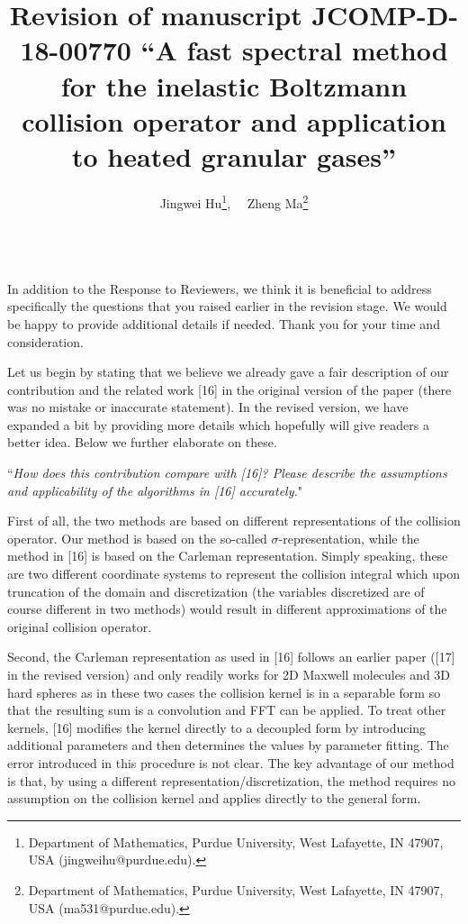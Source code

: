 \documentclass[11pt]{article}
\begin{document}
\title{Revision of manuscript JCOMP-D-18-00770  ``A fast spectral method for the inelastic Boltzmann collision operator and application to heated granular gases''}
\author{Jingwei Hu\footnote{Department of Mathematics, Purdue University, West Lafayette, IN 47907, USA (jingweihu@purdue.edu).}, \  \  
	    Zheng Ma\footnote{Department of Mathematics, Purdue University, West Lafayette, IN 47907, USA (ma531@purdue.edu).}
           }      
	\maketitle

\\

In addition to the Response to Reviewers, we think it is beneficial to address specifically the questions that you raised earlier in the revision stage. We would be happy to provide additional details if needed. Thank you for your time and consideration.

\bigskip
Let us begin by stating that we believe we already gave a fair description of our contribution and the related work [16] in the original version of the paper (there was no mistake or inaccurate statement). In the revised version, we have expanded a bit by providing more details which hopefully will give readers a better idea. Below we further elaborate on these.

 ``{\it How does this contribution compare with [16]? Please describe the assumptions and applicability of the algorithms in [16] accurately.}"

First of all, the two methods are based on different representations of the collision operator. Our method is based on the so-called $\sigma$-representation, while the method in [16] is based on the Carleman representation. Simply speaking, these are two different coordinate systems to represent the collision integral which upon truncation of the domain and discretization (the variables discretized are of course different in two methods) would result in different approximations of the original collision operator. 

Second, the Carleman representation as used in [16] follows an earlier paper ([17] in the revised version) and only readily works for 2D Maxwell molecules and 3D hard spheres as in these two cases the collision kernel is in a separable form so that the resulting sum is a convolution and FFT can be applied. To treat other kernels, [16] modifies the kernel directly to a decoupled form by introducing additional parameters and then determines the values by parameter fitting. The error introduced in this procedure is not clear. The key advantage of our method is that, by using a different representation/discretization, the method requires no assumption on the collision kernel and applies directly to the general form.
\end{document}
